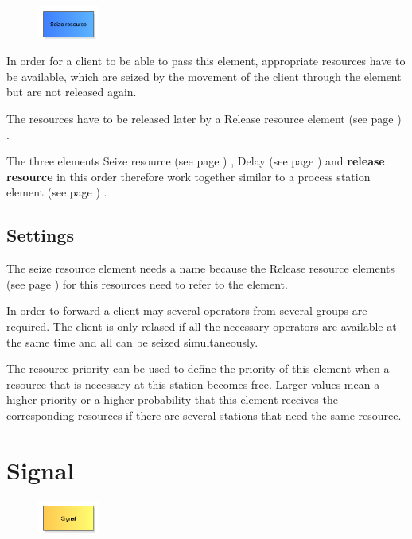 \begin{figure}
\vspace{-22pt}
\includegraphics[width=2cm]{imageModelElementSeize.png}
\vspace{-22pt}
\end{figure}

In order for a client to be able to pass this element, appropriate resources have to be available,
which are seized by the movement of the client through the element but are not released again.

The resources have to be released later by a Release resource element (see page \pageref{ref:ModelElementRelease}) .

The three elements Seize resource (see page \pageref{ref:ModelElementSeize}) , Delay (see page \pageref{ref:ModelElementDelay}) and
\textbf{release resource} in this order therefore work together similar to a
process station element (see page \pageref{ref:ModelElementProcess}) .

\subsection*{Settings}

The seize resource element needs a name because the Release resource elements (see page \pageref{ref:ModelElementRelease}) 
for this resources need to refer to the element.

In order to forward a client may several operators from several groups are required.
The client is only relased if all the necessary operators are available at the same
time and all can be seized simultaneously.

The resource priority can be used to define the priority of this element when a resource that
is necessary at this station becomes free. Larger values mean a higher priority or a higher probability
that this element receives the corresponding resources if there are several stations that need the same resource.


\section{Signal}
\label{ref:ModelElementSignal}

\begin{figure}
\vspace{-22pt}
\includegraphics[width=2cm]{imageModelElementSignal.png}
\vspace{-22pt}
\end{figure}

